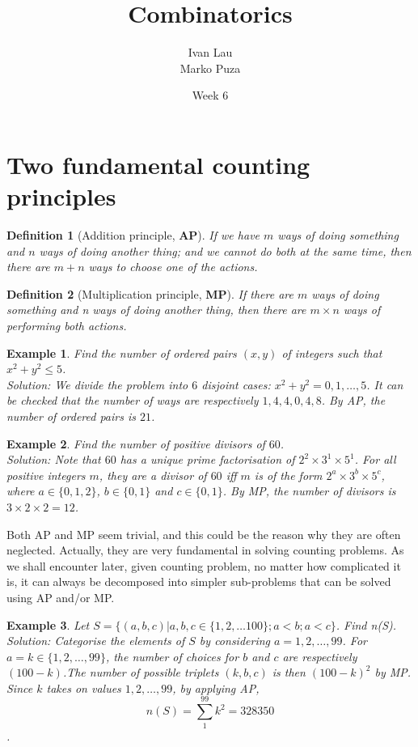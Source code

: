 \documentclass[11pt,a5paper]{article}
\title{\textbf{Combinatorics}}
\date{Week 6}
\author{Ivan Lau\\Marko Puza}
\newtheorem{definition}{Definition}
\newtheorem{example}{Example}
\begin{document}
\maketitle


\section{Two fundamental counting principles}

\begin{definition}[Addition principle, \textbf{AP}]
If we have $m$ ways of doing something and $n$ ways of doing another thing; and we cannot do both at the same time, then there are $m+n$ ways to choose one of the actions.
\end{definition}

\begin{definition}[Multiplication principle, \textbf{MP}]
If there are $m$ ways of doing something and n ways of doing another thing, then there are $m \times n$ ways of performing both actions.
\end{definition}

\begin{example} Find the number of ordered pairs $(x,y)$ of integers such that $x^2+y^2 \le 5$.\\
\textit{Solution}: We divide the problem into $6$ disjoint cases: $x^2+y^2 = 0,1,…,5$. It can be checked that the number of ways are respectively $1,4,4,0,4,8$. By AP, the number of ordered pairs is $21$.
\end{example}

\begin{example} Find the number of positive divisors of $60$. \\
\textit{Solution}: Note that $60$ has a unique prime factorisation of $2^2 \times 3^1 \times 5^1$. For all positive integers $m$, they are a divisor of $60$ iff $m$ is of the form $2^a \times 3^b \times 5^c$, where $a \in \{0,1,2\}$, $b \in \{0,1\}$ and $c \in \{0,1\}$. By MP, the number of divisors is $3 \times 2 \times 2 = 12$.
\end{example}

\noindent Both AP and MP seem trivial, and this could be the reason why they are often neglected. Actually, they are very fundamental in solving counting problems. As we shall encounter later, given counting problem, no matter how complicated it is, it can always be decomposed into simpler sub-problems that can be solved using AP and/or MP.

\begin{example} Let $S = \{(a,b,c) | a,b,c \in \{1,2,…100\}; a<b; a<c\}$.  Find n(S). \\
\textit{Solution}: Categorise the elements of $S$ by considering $a = 1,2,…,99$.  For $a = k \in \{1,2,…,99\}$, the number of choices for $b$ and $c$ are respectively $(100-k)$.The number of possible triplets $(k,b,c)$ is then $(100-k)^2$ by MP. Since $k$ takes on values $1,2,…,99$, by applying AP, \[n(S)= \sum_1^{99}{k^2} = 328350\].
\end{example}
\end{document}
